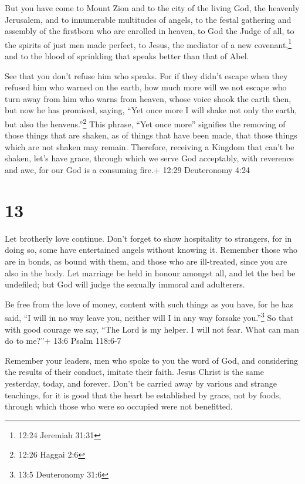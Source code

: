  But you have come to Mount Zion and to the city of the
living God, the heavenly Jerusalem, and to innumerable multitudes of
angels,  to the festal gathering and assembly of the
firstborn who are enrolled in heaven, to God the Judge of all, to the
spirits of just men made perfect,  to Jesus, the mediator
of a new covenant,\footnote{12:24 Jeremiah 31:31} and to the blood of
sprinkling that speaks better than that of Abel.

 See that you don't refuse him who speaks. For if they
didn't escape when they refused him who warned on the earth, how much
more will we not escape who turn away from him who warns from heaven,
 whose voice shook the earth then, but now he has promised,
saying, ``Yet once more I will shake not only the earth, but also the
heavens.''\footnote{12:26 Haggai 2:6}  This phrase, ``Yet
once more'' signifies the removing of those things that are shaken, as
of things that have been made, that those things which are not shaken
may remain.  Therefore, receiving a Kingdom that can't be
shaken, let's have grace, through which we serve God acceptably, with
reverence and awe,  for our God is a consuming fire.+ 12:29
Deuteronomy 4:24

\hypertarget{section-12}{%
\section{13}\label{section-12}}

 Let brotherly love continue.  Don't forget to
show hospitality to strangers, for in doing so, some have entertained
angels without knowing it.  Remember those who are in bonds,
as bound with them, and those who are ill-treated, since you are also in
the body.  Let marriage be held in honour amongst all, and
let the bed be undefiled; but God will judge the sexually immoral and
adulterers.

 Be free from the love of money, content with such things as
you have, for he has said, ``I will in no way leave you, neither will I
in any way forsake you.''\footnote{13:5 Deuteronomy 31:6} 
So that with good courage we say, ``The Lord is my helper. I will not
fear. What can man do to me?''+ 13:6 Psalm 118:6-7

 Remember your leaders, men who spoke to you the word of
God, and considering the results of their conduct, imitate their faith.
 Jesus Christ is the same yesterday, today, and forever.
 Don't be carried away by various and strange teachings, for
it is good that the heart be established by grace, not by foods, through
which those who were so occupied were not benefitted.

